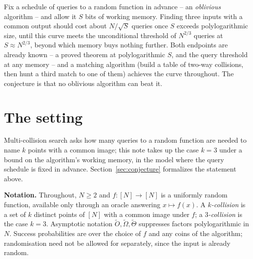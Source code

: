 \documentclass{aicr-conjecture}
\newcommand{\NN}{[N]}
\begin{document}

\vspace{0.4em}

\begin{informalconjecture}
Fix a schedule of queries to a random function in advance -- an \emph{oblivious} algorithm
-- and allow it $S$ bits of working memory. Finding three inputs with a common output should
cost about $N/\sqrt S$ queries once $S$ exceeds polylogarithmic size, until this curve meets
the unconditional threshold of $N^{2/3}$ queries at $S \approx N^{2/3}$, beyond which memory
buys nothing further. Both endpoints are already known -- a proved theorem at
polylogarithmic $S$, and the query threshold at any memory -- and a matching algorithm
(build a table of two-way collisions, then hunt a third match to one of them) achieves the
curve throughout. The conjecture is that no oblivious algorithm can beat it.
\end{informalconjecture}

\section{The setting}\label{sec:setting}

Multi-collision search asks how many queries to a random function are needed to name $k$
points with a common image; this note takes up the case $k = 3$ under a bound on the
algorithm's working memory, in the model where the query schedule is fixed in advance.
Section~\ref{sec:conjecture} formalizes the statement above.

\smallskip
\noindent\textbf{Notation.}
Throughout, $N \geq 2$ and $f \colon \NN \to \NN$ is a uniformly random function, available only
through an oracle answering $x \mapsto f(x)$.  A \emph{$k$-collision} is a set of $k$ distinct
points of $\NN$ with a common image under $f$; a \emph{$3$-collision} is the case $k = 3$.
Asymptotic notation $\tilde O, \tilde\Omega, \tilde\Theta$ suppresses factors polylogarithmic in
$N$.  Success probabilities are over the choice of $f$ and any coins of the algorithm;
randomisation need not be allowed for separately, since the input is already random.
\end{document}
